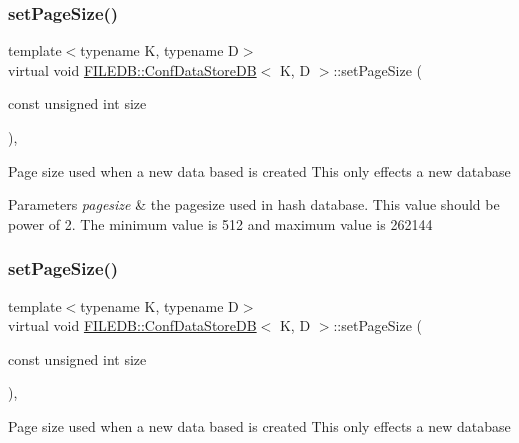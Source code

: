\subsubsection{\texorpdfstring{setPageSize()}{setPageSize()}\hspace{0.1cm}{\footnotesize\ttfamily [1/2]}}
{\footnotesize\ttfamily template$<$typename K, typename D$>$ \\
virtual void \mbox{\hyperlink{classFILEDB_1_1ConfDataStoreDB}{F\+I\+L\+E\+D\+B\+::\+Conf\+Data\+Store\+DB}}$<$ K, D $>$\+::set\+Page\+Size (\begin{DoxyParamCaption}\item[{const unsigned int}]{size }\end{DoxyParamCaption})\hspace{0.3cm}{\ttfamily [inline]}, {\ttfamily [virtual]}}

Page size used when a new data based is created This only effects a new database


\begin{DoxyParams}{Parameters}
{\em pagesize} & the pagesize used in hash database. This value should be power of 2. The minimum value is 512 and maximum value is 262144 \\
\hline
\end{DoxyParams}
\mbox{\label{classFILEDB_1_1ConfDataStoreDB_a50004cb93881959d0846a12d920a95c8}} 
\subsubsection{\texorpdfstring{setPageSize()}{setPageSize()}\hspace{0.1cm}{\footnotesize\ttfamily [2/2]}}
{\footnotesize\ttfamily template$<$typename K, typename D$>$ \\
virtual void \mbox{\hyperlink{classFILEDB_1_1ConfDataStoreDB}{F\+I\+L\+E\+D\+B\+::\+Conf\+Data\+Store\+DB}}$<$ K, D $>$\+::set\+Page\+Size (\begin{DoxyParamCaption}\item[{const unsigned int}]{size }\end{DoxyParamCaption})\hspace{0.3cm}{\ttfamily [inline]}, {\ttfamily [virtual]}}

Page size used when a new data based is created This only effects a new database


